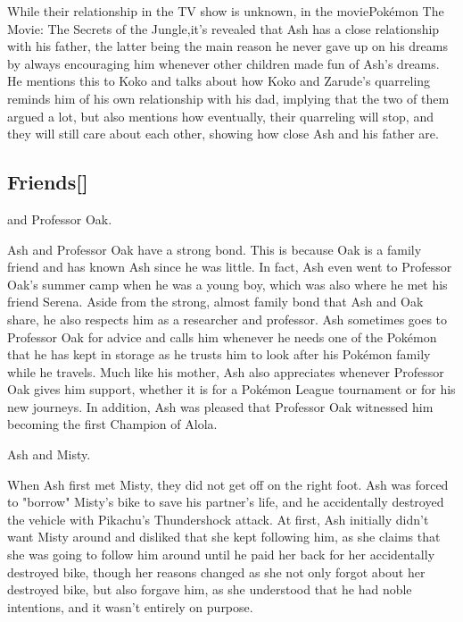 \documentclass[a4paper,12pt]{article}
\begin{document}
While their relationship in the TV show is unknown, in the moviePokémon The Movie: The Secrets of the Jungle,it's revealed that Ash has a close relationship with his father, the latter being the main reason he never gave up on his dreams by always encouraging him whenever other children made fun of Ash's dreams. He mentions this to Koko and talks about how Koko and Zarude's quarreling reminds him of his own relationship with his dad, implying that the two of them argued a lot, but also mentions how eventually, their quarreling will stop, and they will still care about each other, showing how close Ash and his father are.\\ \par \vspace{0.5cm}

\subsection*{Friends[]}\n\nAsh and Professor Oak.\\ \par \vspace{0.5cm}

Ash and Professor Oak have a strong bond. This is because Oak is a family friend and has known Ash since he was little. In fact, Ash even went to Professor Oak's summer camp when he was a young boy, which was also where he met his friend Serena. Aside from the strong, almost family bond that Ash and Oak share, he also respects him as a researcher and professor. Ash sometimes goes to Professor Oak for advice and calls him whenever he needs one of the Pokémon that he has kept in storage as he trusts him to look after his Pokémon family while he travels. Much like his mother, Ash also appreciates whenever Professor Oak gives him support, whether it is for a Pokémon League tournament or for his new journeys. In addition, Ash was pleased that Professor Oak witnessed him becoming the first Champion of Alola.\\ \par \vspace{0.5cm}

Ash and Misty.\\ \par \vspace{0.5cm}

When Ash first met Misty, they did not get off on the right foot. Ash was forced to "borrow" Misty's bike to save his partner's life, and he accidentally destroyed the vehicle with Pikachu's Thundershock attack. At first, Ash initially didn't want Misty around and disliked that she kept following him, as she claims that she was going to follow him around until he paid her back for her accidentally destroyed bike, though her reasons changed as she not only forgot about her destroyed bike, but also forgave him, as she understood that he had noble intentions, and it wasn't entirely on purpose.\\ \par \vspace{0.5cm}
\end{document}
